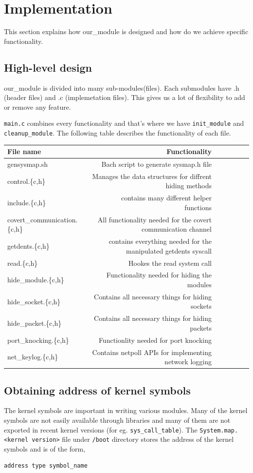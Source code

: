 \documentclass[10pt, letterpaper]{scrartcl}
\begin{document}
\section{Implementation}
This section explains how our\_module is designed and how do we achieve specific functionality. 

\subsection{High-level design}
our\_module is divided into many sub-modules(files). Each submodules have .h (header files) and .c (implemetation files).
This gives us a lot of flexibility to add or remove any feature.

\texttt{main.c} combines every functionality and that's where we have \texttt{init\_module} and \texttt{cleanup\_module}.
The following table describes the functionality of each file.



\begin{tabular}{l*{6}r}
File name             & Functionality \\
\hline
gensysmap.sh & Bach script to generate sysmap.h file\\
control.\{c,h\} & Manages the data structures for diffrent hiding methods\\
include.\{c,h\} & contains many different helper functions   \\
covert\_communication.\{c,h\} & All functionality needed for the covert communication channel \\
getdents.\{c,h\} & contains everything needed for the manipulated getdents syscall\\
read.\{c,h\} & Hookes the read system call \\
hide\_module.\{c,h\} & Functionality needed for hiding the modules\\
hide\_socket.\{c,h\} & Contains all necessary things for hiding sockets\\
hide\_packet.\{c,h\} & Contains all necessary things for hiding packets\\
port\_knocking.\{c,h\} & Functionlity needed for port knocking\\
net\_keylog.\{c,h\} & Contains netpoll APIs for implementing network logging\\

\end{tabular}




\subsection{Obtaining address of kernel symbols}
The kernel symbols are important in writing various modules. Many of the kernel symbols are not easily available through libraries 
and many of them are not exported in recent kernel versions (for eg. \texttt{sys\_call\_table}).
The \texttt{System.map.<kernel version>} file under \texttt{/boot} directory stores the address of the kernel symbols and is of the form, 
\begin{verbatim}
address type symbol_name
\end{verbatim}
\end{document}
